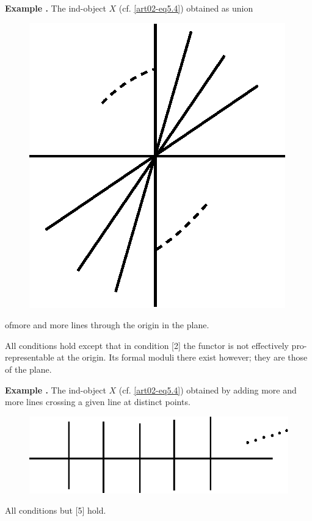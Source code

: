 \medskip
\noindent
{\bf Example .\label{art02-exam5.9}}
The ind-object $X$ (cf. \eqref{art02-eq5.4}) obtained as union
\begin{figure}[H]
\centering
\includegraphics{src/chap2/fig3.eps}
\end{figure}
of\pageoriginale more and more lines through the origin in the plane.
\smallskip

All conditions hold except that in condition [2] the functor is not effectively pro-representable at the origin. Its formal moduli there exist however; they are those of the plane.

\medskip
\noindent
{\bf Example .\label{art02-exam5.10}}
The ind-object $X$ (cf. \eqref{art02-eq5.4}) obtained by adding more and more lines crossing a given line at distinct points.
\begin{figure}[H]
\centering
\includegraphics{src/chap2/fig4.eps}
\end{figure}
All conditions but [5] hold.

